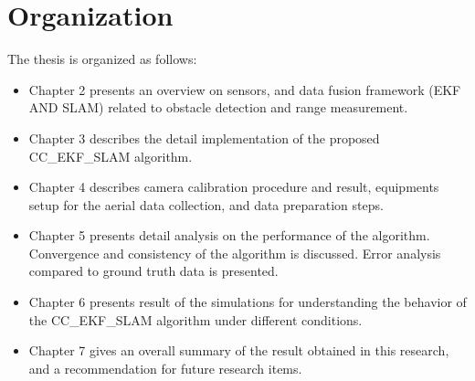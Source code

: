 \section{Organization}\label{section:Organization}
The thesis is organized as follows:

\begin{itemize}
  \item Chapter 2 presents an overview on sensors, and data fusion
  framework (EKF AND SLAM) related to obstacle detection and range measurement.
  \item Chapter 3 describes the detail implementation of the proposed
  CC\_EKF\_SLAM algorithm.
  \item Chapter 4 describes camera calibration procedure and result, equipments
  setup for the aerial data collection, and data preparation steps.
  \item Chapter 5 presents detail analysis on the performance of the
  algorithm. Convergence and consistency of the algorithm is
  discussed. Error analysis compared to ground truth data is presented. 
  \item Chapter 6 presents result of the simulations for understanding
  the behavior of the CC\_EKF\_SLAM algorithm under different
  conditions.  
  \item Chapter 7 gives an overall summary of the result obtained in
  this research, and a recommendation for future research items. 
\end{itemize}

